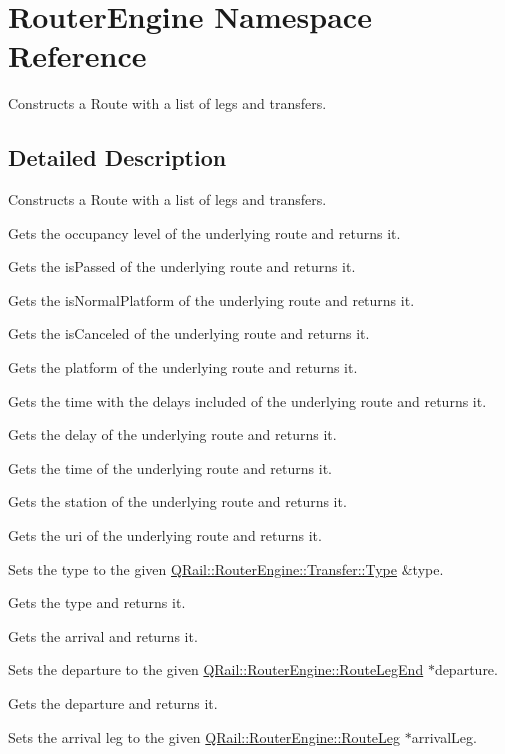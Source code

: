\hypertarget{namespaceRouterEngine}{}\section{Router\+Engine Namespace Reference}
\label{namespaceRouterEngine}


Constructs a Route with a list of legs and transfers.  




\subsection{Detailed Description}
Constructs a Route with a list of legs and transfers. 

Gets the occupancy level of the underlying route and returns it.

Gets the is\+Passed of the underlying route and returns it.

Gets the is\+Normal\+Platform of the underlying route and returns it.

Gets the is\+Canceled of the underlying route and returns it.

Gets the platform of the underlying route and returns it.

Gets the time with the delays included of the underlying route and returns it.

Gets the delay of the underlying route and returns it.

Gets the time of the underlying route and returns it.

Gets the station of the underlying route and returns it.

Gets the uri of the underlying route and returns it.

Sets the type to the given \mbox{\hyperlink{classQRail_1_1RouterEngine_1_1Transfer_a5a0b372acbdfb9381fb937bf163edfa6}{Q\+Rail\+::\+Router\+Engine\+::\+Transfer\+::\+Type}} \&type.

Gets the type and returns it.

Gets the arrival and returns it.

Sets the departure to the given \mbox{\hyperlink{classQRail_1_1RouterEngine_1_1RouteLegEnd}{Q\+Rail\+::\+Router\+Engine\+::\+Route\+Leg\+End}} $\ast$departure.

Gets the departure and returns it.

Sets the arrival leg to the given \mbox{\hyperlink{classQRail_1_1RouterEngine_1_1RouteLeg}{Q\+Rail\+::\+Router\+Engine\+::\+Route\+Leg}} $\ast$arrival\+Leg.

